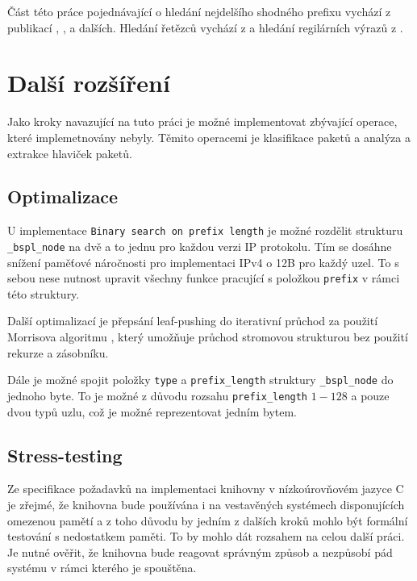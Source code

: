Část této práce pojednávající o hledání nejdelšího shodného prefixu vychází z publikací
\cite{tbm}, \cite{bspl}, a dalších. Hledání řetězců vychází z \cite{aho} a hledání regilárních výrazů
 z \cite{}.

\section{Další rozšíření}
Jako kroky navazující na tuto práci je možné implementovat zbývající operace, které implemetnovány nebyly.
Těmito operacemi je klasifikace paketů a analýza a extrakce hlaviček paketů.

\subsection{Optimalizace}
U implementace \texttt{Binary search on prefix length} je možné rozdělit strukturu \texttt{\_bspl\_node}
na dvě a to jednu pro každou verzi IP protokolu. Tím se dosáhne snížení paměťové náročnosti
pro implementaci IPv4 o 12B pro každý uzel. To s sebou nese nutnost upravit všechny funkce pracující
s položkou \texttt{prefix} v rámci této struktury.

Další optimalizací je přepsání leaf-pushing do iterativní průchod za použití Morrisova algoritmu \cite{morris},
který umožňuje průchod stromovou strukturou bez použití rekurze a zásobníku.

Dále je možné spojit položky \texttt{type} a \texttt{prefix\_length} struktury \texttt{\_bspl\_node}
do jednoho byte. To je možné z důvodu rozsahu \texttt{prefix\_length} $1-128$ a pouze dvou typů uzlu,
což je možné reprezentovat jedním bytem.

\subsection{Stress-testing}
Ze specifikace požadavků na implementaci knihovny v nízkoúrovňovém jazyce C je zřejmé,
že knihovna bude používána i na vestavěných systémech disponujících omezenou pamětí a z toho
důvodu by jedním z dalších kroků mohlo být formální testování s nedostatkem paměti.
To by mohlo dát rozsahem na celou další práci. Je nutné ověřit, že knihovna bude
reagovat správným způsob a nezpůsobí pád systému v rámci kterého je spouštěna.
